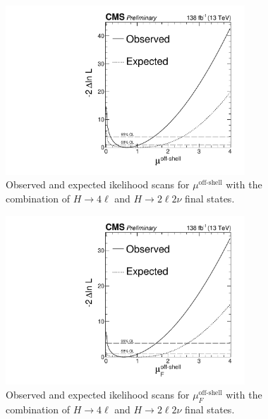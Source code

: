 \begin{figure}[!hbt]
\begin{center}
\includegraphics[width=0.8\textwidth]{figures/scan_Roff_upd.pdf}
\caption
{
Observed and expected ikelihood scans for $\mu^{\text{off-shell}}$ with the combination of $H\to4\ell$ and $H\to2\ell2\nu$ final states.
\label{fig:1Dmus_off}
}
\end{center}
\end{figure}

\begin{figure}[!hbt]
\begin{center}
\includegraphics[width=0.8\textwidth]{figures/scan_muFoff_upd.pdf}
\caption
{
Observed and expected ikelihood scans for $\mu_F^{\text{off-shell}}$ with the combination of $H\to4\ell$ and $H\to2\ell2\nu$ final states.
\label{fig:1Dmus_F}
}
\end{center}
\end{figure}

